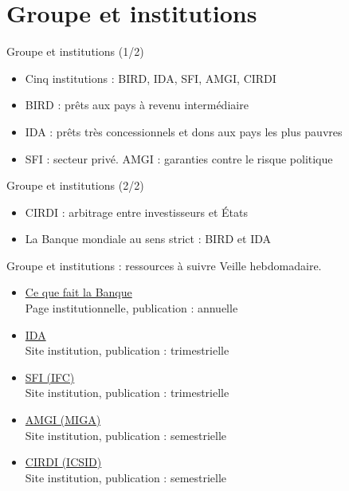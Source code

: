 \documentclass[aspectratio=169,11pt]{beamer}
\begin{document}
\section{Groupe et institutions}
\begin{frame}{Groupe et institutions (1/2)}
\begin{itemize}
\item Cinq institutions : BIRD, IDA, SFI, AMGI, CIRDI
\item BIRD : prêts aux pays à revenu intermédiaire
\item IDA : prêts très concessionnels et dons aux pays les plus pauvres
\item SFI : secteur privé. AMGI : garanties contre le risque politique
\end{itemize}
\end{frame}

\begin{frame}{Groupe et institutions (2/2)}
\begin{itemize}
\item CIRDI : arbitrage entre investisseurs et États
\item La Banque mondiale au sens strict : BIRD et IDA
\end{itemize}
\end{frame}

\begin{frame}{Groupe et institutions : ressources à suivre}
\small
Veille hebdomadaire.
\begin{itemize}
\item \href{https://www.worldbank.org/en/about/what-we-do}{Ce que fait la Banque}\\{\footnotesize Page institutionnelle, publication : annuelle}
\item \href{https://ida.worldbank.org}{IDA}\\{\footnotesize Site institution, publication : trimestrielle}
\item \href{https://www.ifc.org}{SFI (IFC)}\\{\footnotesize Site institution, publication : trimestrielle}
\item \href{https://www.miga.org}{AMGI (MIGA)}\\{\footnotesize Site institution, publication : semestrielle}
\item \href{https://icsid.worldbank.org}{CIRDI (ICSID)}\\{\footnotesize Site institution, publication : semestrielle}
\end{itemize}
\end{frame}
\end{document}
